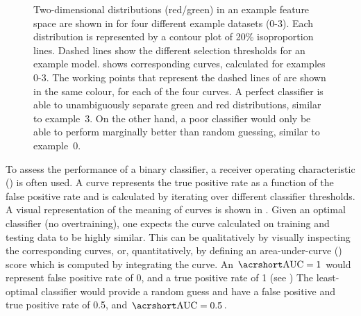 \begin{figure}[htbp!]
    \centering
    \caption{\label{fig:rocs_examples}
    Two-dimensional distributions (red/green) in an example feature space are shown in  for four different example datasets (0-3).
    Each distribution is represented by a contour plot of 20\% isoproportion lines.
    Dashed lines show the different selection thresholds for an example \MVA model.
     shows corresponding \ROC curves, calculated for examples 0-3.
    The working points that represent the dashed lines of  are shown in the same colour, for each of the four curves.
    A perfect classifier is able to unambiguously separate green and red distributions, similar to example~3.
    On the other hand, a poor classifier would only be able to perform marginally better than random guessing, similar to example~0.    
    }
\end{figure}


To assess the performance of a binary classifier, a receiver operating characteristic (\ROC) is often used.
A \ROC curve represents the true positive rate as a function of the false positive rate and is calculated by iterating over different \MVA classifier thresholds.
A visual representation of the meaning of \ROC curves is shown in .
Given an optimal classifier (no overtraining), one expects the \ROC curve calculated on training and testing data to be highly similar.
This can be qualitatively by visually inspecting the corresponding curves, or, quantitatively, by defining an area-under-curve (\AUC) score which is computed by integrating the \ROC curve.
An $\mathrm{\AUC}=1$ would represent false positive rate of 0, and a true positive rate of 1 (see )
The least-optimal classifier would provide a random guess and have a false positive and true positive rate of 0.5, and $\mathrm{\AUC}=0.5$.

